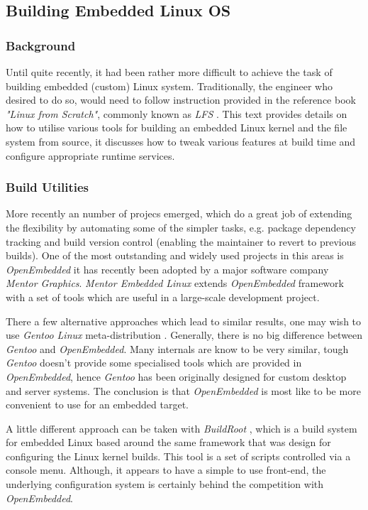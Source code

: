 \subsection{Building Embedded Linux OS}

\subsubsection{Background}

  Until quite recently, it had been rather more difficult to achieve
 the task of building embedded (custom) Linux system. Traditionally,
 the engineer who desired to do so, would need to follow instruction
 provided in the reference book \emph{"Linux from Scratch"}, commonly
 known as \emph{LFS} \cite{book:lfs}. This text provides details on
 how to utilise various tools for building an embedded Linux kernel
 and the file system from source, it discusses how to tweak various
 features at build time and configure appropriate runtime services.

\subsubsection{Build Utilities}
 
  More recently an number of projecs emerged, which do a
 great job of extending the flexibility by automating some of the
 simpler tasks, e.g. package dependency tracking and build version
 control (enabling the maintainer to revert to previous builds).
 One of the most outstanding and widely used projects in this areas
 is \emph{OpenEmbedded} \cite{links:oe} it has recently been adopted
 by a major software company \emph{Mentor Graphics}. \emph{Mentor
 Embedded Linux} extends \emph{OpenEmbedded} framework with a set
 of tools which are useful in a large-scale development project.
 
  There a few alternative approaches which lead to similar results,
 one may wish to use \emph{Gentoo Linux} meta-distribution
 \cite{links:gentoo:embedded}.
 Generally, there is no big difference between \emph{Gentoo} and
 \emph{OpenEmbedded}. Many internals are know to be very similar,
 tough \emph{Gentoo} doesn't provide some specialised tools which 
 are provided in \emph{OpenEmbedded}, hence \emph{Gentoo} has been
 originally designed for custom desktop and server systems.
 The conclusion is that \emph{OpenEmbedded} is most like to be
 more convenient to use for an embedded target.
 
  A little different approach can be taken with \emph{BuildRoot}
 \cite{links:buildroot:homepage}, which is a build system for
 embedded Linux based around the same framework that was design
 for configuring the Linux kernel builds. This tool is a set of
 scripts controlled via a console menu. Although, it appears to
 have a simple to use front-end, the underlying configuration
 system is certainly behind the competition with \emph{OpenEmbedded}.

